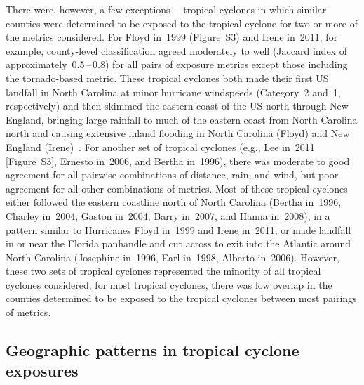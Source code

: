There were, however, a few exceptions\,---\,tropical cyclones in which similar
counties were determined to be exposed to the tropical cyclone for two or more
of the metrics considered.  For Floyd in~1999 (Figure~S3)
and Irene in~2011, for example, county-level classification agreed moderately
to well (Jaccard index of approximately~0.5\,--\,0.8) for all pairs of exposure
metrics except those including the tornado-based metric. These tropical
cyclones both made their first \ac{US}  landfall in North Carolina at minor
hurricane windspeeds (Category~2 and~1, respectively) and then skimmed the
eastern coast of the \ac{US} north through New England, bringing large rainfall
to much of the eastern coast from North Carolina north and causing extensive
inland flooding in North Carolina (Floyd) and New England
(Irene)~\parencite{avila2013atlantic, lawrence2000atlantic}. For another set of
tropical cyclones (e.g., Lee in~2011 [Figure~S3], Ernesto
in~2006, and Bertha in~1996), there was moderate to good agreement for all
pairwise combinations of distance, rain, and wind, but poor agreement for all
other combinations of metrics. Most of these tropical cyclones either followed
the eastern coastline north of North Carolina (Bertha in~1996, Charley in~2004,
Gaston in~2004, Barry in~2007, and Hanna in~2008), in a pattern similar to
Hurricanes Floyd in~1999 and Irene in~2011, or made landfall in or near the
Florida panhandle and cut across to exit into the Atlantic around North
Carolina (Josephine in~1996, Earl in~1998, Alberto in~2006). However, these two
sets of tropical cyclones represented the minority of all tropical cyclones
considered; for most tropical cyclones, there was low overlap in the counties
determined to be exposed to the tropical cyclones between most pairings of
metrics.

\subsection*{Geographic patterns in tropical cyclone exposures}

